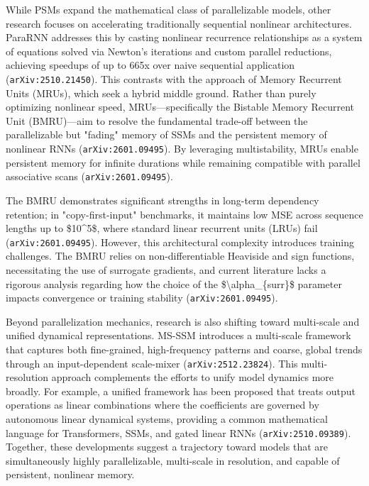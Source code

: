 \documentclass[11pt]{article}
\begin{document}
While PSMs expand the mathematical class of parallelizable models, other research focuses on accelerating traditionally sequential nonlinear architectures. ParaRNN addresses this by casting nonlinear recurrence relationships as a system of equations solved via Newton's iterations and custom parallel reductions, achieving speedups of up to 665x over naive sequential application (\texttt{arXiv:2510.21450}). This contrasts with the approach of Memory Recurrent Units (MRUs), which seek a hybrid middle ground. Rather than purely optimizing nonlinear speed, MRUs—specifically the Bistable Memory Recurrent Unit (BMRU)—aim to resolve the fundamental trade-off between the parallelizable but "fading" memory of SSMs and the persistent memory of nonlinear RNNs (\texttt{arXiv:2601.09495}). By leveraging multistability, MRUs enable persistent memory for infinite durations while remaining compatible with parallel associative scans (\texttt{arXiv:2601.09495}).

The BMRU demonstrates significant strengths in long-term dependency retention; in "copy-first-input" benchmarks, it maintains low MSE across sequence lengths up to \$10\textasciicircum{}5\$, where standard linear recurrent units (LRUs) fail (\texttt{arXiv:2601.09495}). However, this architectural complexity introduces training challenges. The BMRU relies on non-differentiable Heaviside and sign functions, necessitating the use of surrogate gradients, and current literature lacks a rigorous analysis regarding how the choice of the \$\textbackslash{}alpha\_\{surr\}\$ parameter impacts convergence or training stability (\texttt{arXiv:2601.09495}).

Beyond parallelization mechanics, research is also shifting toward multi-scale and unified dynamical representations. MS-SSM introduces a multi-scale framework that captures both fine-grained, high-frequency patterns and coarse, global trends through an input-dependent scale-mixer (\texttt{arXiv:2512.23824}). This multi-resolution approach complements the efforts to unify model dynamics more broadly. For example, a unified framework has been proposed that treats output operations as linear combinations where the coefficients are governed by autonomous linear dynamical systems, providing a common mathematical language for Transformers, SSMs, and gated linear RNNs (\texttt{arXiv:2510.09389}). Together, these developments suggest a trajectory toward models that are simultaneously highly parallelizable, multi-scale in resolution, and capable of persistent, nonlinear memory.
\end{document}
